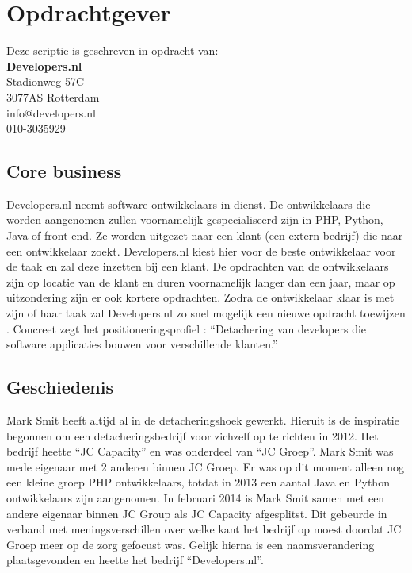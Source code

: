 \section{Opdrachtgever}

Deze scriptie is geschreven in opdracht van:\\[0.3cm]
\textbf{Developers.nl}\\
Stadionweg 57C\\
3077AS Rotterdam\\
info@developers.nl\\
010-3035929\\

\subsection{Core business}
Developers.nl neemt software ontwikkelaars in dienst. De ontwikkelaars die worden aangenomen zullen voornamelijk gespecialiseerd zijn in PHP, Python, Java of front-end. Ze worden uitgezet naar een klant (een extern bedrijf) die naar een ontwikkelaar zoekt. Developers.nl kiest hier voor de beste ontwikkelaar voor de taak en zal deze inzetten bij een klant. De opdrachten van de ontwikkelaars zijn op locatie van de klant en duren voornamelijk langer dan een jaar, maar op uitzondering zijn er ook kortere opdrachten. Zodra de ontwikkelaar klaar is met zijn of haar taak zal Developers.nl zo snel mogelijk een nieuwe opdracht toewijzen \parencite{Stageplan}. Concreet zegt het positioneringsprofiel \parencite{Positioneringsprofiel}: \enquote{Detachering van developers die software applicaties bouwen voor verschillende klanten.}

\subsection{Geschiedenis}
Mark Smit heeft altijd al in de detacheringshoek gewerkt. Hieruit is de inspiratie begonnen om een detacheringsbedrijf voor zichzelf op te richten in 2012. Het bedrijf heette \enquote{JC Capacity} en was onderdeel van \enquote{JC Groep}. Mark Smit was mede eigenaar met 2 anderen binnen JC Groep. Er was op dit moment alleen nog een kleine groep PHP ontwikkelaars, totdat in 2013 een aantal Java en Python ontwikkelaars zijn aangenomen. In februari 2014 is Mark Smit samen met een andere eigenaar binnen JC Group als JC Capacity afgesplitst. Dit gebeurde in verband met meningsverschillen over welke kant het bedrijf op moest doordat JC Groep meer op de zorg gefocust was. Gelijk hierna is een naamsverandering plaatsgevonden en heette het bedrijf \enquote{Developers.nl}.

